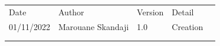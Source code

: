 \documentclass[a4paper,11pt]{book}
\begin{document}
\begin{table}[h]
\begin{tabular}{lllll}
\cline{1-4}
\multicolumn{1}{|l|}{Date}       & \multicolumn{1}{l|}{Author}         & \multicolumn{1}{l|}{Version} & \multicolumn{1}{l|}{Detail}   &  \\ \cline{1-4}
\multicolumn{1}{|l|}{01/11/2022} & \multicolumn{1}{l|}{Marouane Skandaji} & \multicolumn{1}{l|}{1.0}     & \multicolumn{1}{l|}{Creation} &  \\ \cline{1-4}
                                 &                                     &                              &                               &  \\
                                 &                                     &                              &                               &
\end{tabular}
\end{table}
\end{document}
